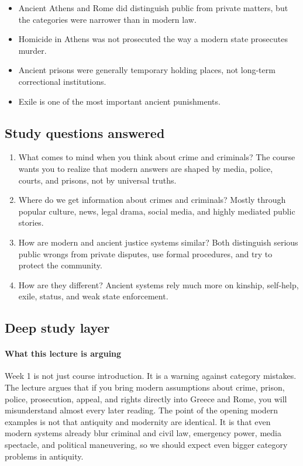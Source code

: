 \documentclass[11pt]{article}
\begin{document}
\begin{itemize}
\item Ancient Athens and Rome did distinguish public from private matters, but the categories were narrower than in modern law.
\item Homicide in Athens was not prosecuted the way a modern state prosecutes murder.
\item Ancient prisons were generally temporary holding places, not long-term correctional institutions.
\item Exile is one of the most important ancient punishments.
\end{itemize}

\subsection{Study questions answered}

\begin{enumerate}
\item What comes to mind when you think about crime and criminals? The course wants you to realize that modern answers are shaped by media, police, courts, and prisons, not by universal truths.
\item Where do we get information about crimes and criminals? Mostly through popular culture, news, legal drama, social media, and highly mediated public stories.
\item How are modern and ancient justice systems similar? Both distinguish serious public wrongs from private disputes, use formal procedures, and try to protect the community.
\item How are they different? Ancient systems rely much more on kinship, self-help, exile, status, and weak state enforcement.
\end{enumerate}

\subsection{Deep study layer}

\paragraph{What this lecture is arguing}

Week 1 is not just course introduction. It is a warning against category mistakes. The lecture argues that if you bring modern assumptions about crime, prison, police, prosecution, appeal, and rights directly into Greece and Rome, you will misunderstand almost every later reading. The point of the opening modern examples is not that antiquity and modernity are identical. It is that even modern systems already blur criminal and civil law, emergency power, media spectacle, and political maneuvering, so we should expect even bigger category problems in antiquity.
\end{document}
